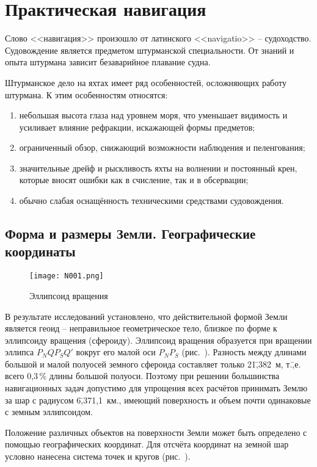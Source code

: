 \twocolumn

\chapter{Практическая навигация\label{chap:6}}

Слово <<навигация>> произошло от латинского <<navigatio>> \---
судоходство. Судовождение является предметом штурманской
специальности. От знаний и опыта штурмана зависит безаварийное
плавание судна.

Штурманское дело на яхтах имеет ряд особенностей, осложняющих работу
штурмана. К этим особенностям относятся:
\begin{enumerate}
\item небольшая высота глаза над уровнем моря, что уменьшает видимость
  и усиливает влияние рефракции, искажающей формы предметов;
\item ограниченный обзор, снижающий возможности наблюдения и
  пеленгования;
\item значительные дрейф и рыскливость яхты на волнении и постоянный
  крен, которые вносят ошибки как в счисление, так и в обсервации;
\item обычно слабая оснащённость техническими средствами судовождения. 
\end{enumerate}

\section{Форма и размеры Земли. Географические координаты} 

\begin{figure}[htb]
  \centering{}
  \texttt{[image: N001.png]}
  \caption{Эллипсоид вращения}
  \label{fig:N1}
\end{figure}

В результате исследований установлено, что действительной формой Земли
является геоид \--- неправильное геометрическое тело, близкое по форме
к эллипсоиду вращения (сфероиду). Эллипсоид вращения образуется при
вращении эллипса $P_NQP_SQ'$ вокруг его малой оси $P_NP_S$
(рис.~). Разность между длинами большой и малой полуосей
земного сфероида составляет только 21\=,382~м, т.\=,е. всего 0,3\,\%
длины большой полуоси. Поэтому при решении большинства навигационных
задач допустимо для упрощения всех расчётов принимать Землю за шар с
радиусом 6\=,371,1~км., имеющий поверхность и объем почти одинаковые с
земным эллипсоидом.

Положение различных объектов на поверхности Земли может быть
определено с помощью географических координат. Для отсчёта координат
на земной шар условно нанесена система точек и кругов (рис.~).

